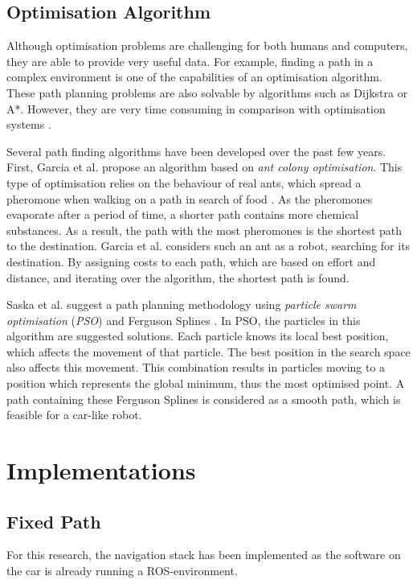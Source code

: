 \documentclass[conference,a4paper]{IEEEtran}
\begin{document}
\subsection{Optimisation Algorithm}
Although optimisation problems are challenging for both humans and computers, they are able to provide very useful data. 
For example, finding a path in a complex environment is one of the capabilities of an optimisation algorithm. These path planning problems are also solvable by algorithms such as Dijkstra or A*. However, they are very time consuming in comparison with optimisation systems \cite{Dang2014}.

Several path finding algorithms have been developed over the past few years. First, Garcia et al. propose an algorithm based on \emph{ant colony optimisation}\cite{Garcia2009}. This type of optimisation relies on the behaviour of real ants, which spread a pheromone when walking on a path in search of food \cite{Dorigo2006}. As the pheromones evaporate after a period of time, a shorter path contains more chemical substances. As a result, the path with the most pheromones is the shortest path to the destination. Garcia et al. considers such an ant as a robot, searching for its destination. By assigning costs to each path, which are based on effort and distance, and iterating over the algorithm, the shortest path is found.

Saska et al. suggest a path planning methodology using \emph{particle swarm optimisation} (\emph{PSO}) and Ferguson Splines \cite{Saska2006}. In PSO, the particles in this algorithm are suggested solutions. Each particle knows its local best position, which affects the movement of that particle. The best position in the search space also affects this movement. This combination results in particles moving to a position which represents the global minimum, thus the most optimised point. A path containing these Ferguson Splines is considered as a smooth path, which is feasible for a car-like robot.

\section{Implementations}
\label{sec:Implementations}
\subsection{Fixed Path}
For this research, the navigation stack has been implemented as the software on the car is already running a ROS-environment.
\end{document}
